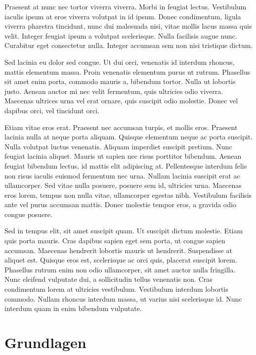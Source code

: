 \documentclass[12pt,oneside,a4paper,parskip]{scrbook}
\begin{document}
Praesent at nunc nec tortor viverra viverra. Morbi in feugiat lectus. Vestibulum iaculis ipsum at eros viverra volutpat in id ipsum. Donec condimentum, ligula viverra pharetra tincidunt, nunc dui malesuada nisi, vitae mollis lacus massa quis velit. Integer feugiat ipsum a volutpat scelerisque. Nulla facilisis augue nunc. Curabitur eget consectetur nulla. Integer accumsan sem non nisi tristique dictum.

Sed lacinia eu dolor sed congue. Ut dui orci, venenatis id interdum rhoncus, mattis elementum massa. Proin venenatis elementum purus ut rutrum. Phasellus sit amet enim porta, commodo mauris a, bibendum tortor. Nulla ut lobortis justo. Aenean auctor mi nec velit fermentum, quis ultricies odio viverra. Maecenas ultrices urna vel erat ornare, quis suscipit odio molestie. Donec vel dapibus orci, vel tincidunt orci.

Etiam vitae eros erat. Praesent nec accumsan turpis, et mollis eros. Praesent lacinia nulla at neque porta aliquam. Quisque elementum neque ac porta suscipit. Nulla volutpat luctus venenatis. Aliquam imperdiet suscipit pretium. Nunc feugiat lacinia aliquet. Mauris ut sapien nec risus porttitor bibendum. Aenean feugiat bibendum lectus, id mattis elit adipiscing at. Pellentesque interdum felis non risus iaculis euismod fermentum nec urna. Nullam lacinia suscipit erat ac ullamcorper. Sed vitae nulla posuere, posuere sem id, ultricies urna. Maecenas eros lorem, tempus non nulla vitae, ullamcorper egestas nibh. Vestibulum facilisis ante vel purus accumsan mattis. Donec molestie tempor eros, a gravida odio congue posuere.

Sed in tempus elit, sit amet suscipit quam. Ut suscipit dictum molestie. Etiam quis porta mauris. Cras dapibus sapien eget sem porta, ut congue sapien accumsan. Maecenas hendrerit lobortis mauris ut hendrerit. Suspendisse at aliquet est. Quisque eros est, scelerisque ac orci quis, placerat suscipit lorem. Phasellus rutrum enim non odio ullamcorper, sit amet auctor nulla fringilla. Nunc eleifend vulputate dui, a sollicitudin tellus venenatis non. Cras condimentum lorem at ultricies vestibulum. Vestibulum interdum lobortis commodo. Nullam rhoncus interdum massa, ut varius nisi scelerisque id. Nunc interdum quam in enim bibendum vulputate.

\cite{gamma2011patterns}

\chapter{Grundlagen}
\end{document}
